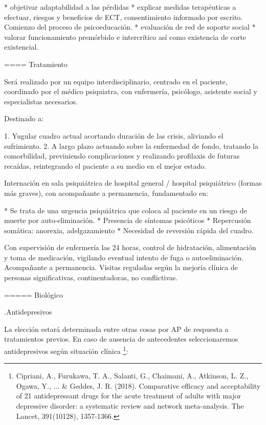 \documentclass[encares.tex]{subfiles}
\begin{document}
* objetivar adaptabilidad a las pérdidas
* explicar medidas terapéuticas a efectuar, riesgos y beneficios de ECT, consentimiento informado por escrito. Comienzo del proceso de psicoeducación.
* evaluación de red de soporte social
* valorar funcionamiento premórbido e intercrítico así como existencia de corte existencial.

==== Tratamiento

Será realizado por un equipo interdisciplinario, centrado en el paciente, coordinado por el médico psiquiatra, con enfermería, psicólogo, asistente social y especialistas necesarios.

Destinado a:

1. Yugular cuadro actual acortando duración de las crisis, aliviando el sufrimiento.
2. A largo plazo actuando sobre la enfermedad de fondo, tratando la comorbilidad, previniendo complicaciones y realizando profilaxis de futuras recaídas, reintegrando el paciente a su medio en el mejor estado.

Internación en sala psiquiátrica de hospital general / hospital psiquiátrico (formas más graves), con acompañante a permanencia, fundamentado en:

* Se trata de una urgencia psiquiátrica que coloca al paciente en un riesgo de muerte por auto-eliminación.
* Presencia de síntomas psicóticos
* Repercusión somática: anorexia, adelgazamiento
* Necesidad de reversión rápida del cuadro.

Con supervisión de enfermería las 24 horas, control de hidratación, alimentación y toma de medicación, vigilando eventual intento de fuga o autoeliminación. Acompañante a permanencia. Visitas reguladas según la mejoría clínica de personas significativas, continentadoras, no conflictivas.

===== Biológico

.Antidepresivos

La elección estará determinada entre otras cosas por AP de respuesta a tratamientos previos. En caso de ausencia de antecedentes seleccionaremos antidepresivos según situación clínica \footnote{Cipriani, A., Furukawa, T. A., Salanti, G., Chaimani, A., Atkinson, L. Z., Ogawa, Y., ... \& Geddes, J. R. (2018). Comparative efficacy and acceptability of 21 antidepressant drugs for the acute treatment of adults with major depressive disorder: a systematic review and network meta-analysis. The Lancet, 391(10128), 1357-1366.}:
\end{document}
